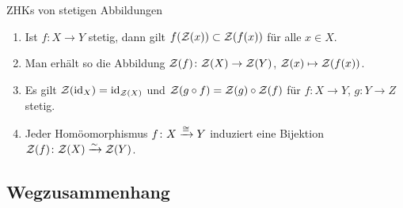 \begin{Satz}{ZHKs von stetigen Abbildungen}
    \begin{enumerate}
        \item
        Ist $f\colon X \rightarrow Y$ stetig, dann gilt
        $f(\mathcal{Z}(x)) \subset \mathcal{Z}(f(x))$ für alle $x \in X$.

        \item
        Man erhält so die Abbildung
        $\mathcal{Z}(f)\colon \mathcal{Z}(X) \rightarrow \mathcal{Z}(Y)$,
        $\mathcal{Z}(x) \mapsto \mathcal{Z}(f(x))$.

        \item
        Es gilt $\mathcal{Z}(\operatorname{id}_X) = \operatorname{id}_{\mathcal{Z}(X)}$ und
        $\mathcal{Z}(g \circ f) = \mathcal{Z}(g) \circ \mathcal{Z}(f)$ für
        $f\colon X \rightarrow Y$, $g\colon Y \rightarrow Z$ stetig.

        \item
        Jeder Homöomorphismus $f\colon X \xrightarrow{\cong} Y$ induziert eine Bijektion
        $\mathcal{Z}(f)\colon \mathcal{Z}(X) \xrightarrow{\sim} \mathcal{Z}(Y)$.
    \end{enumerate}
\end{Satz}

\subsection{%
    Wegzusammenhang%
}


